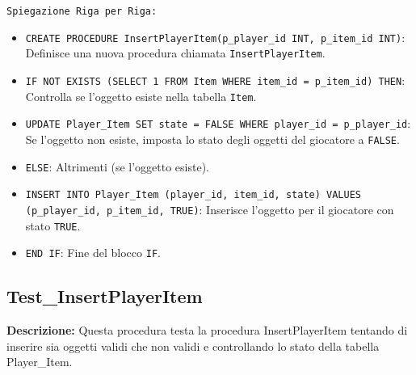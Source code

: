 \documentclass{article}
\begin{document}
\texttt{Spiegazione Riga per Riga:}
\begin{itemize}
    \item \lstinline|CREATE PROCEDURE InsertPlayerItem(p_player_id INT, p_item_id INT)|: Definisce una nuova procedura chiamata \lstinline|InsertPlayerItem|.
    \item \lstinline|IF NOT EXISTS (SELECT 1 FROM Item WHERE item_id = p_item_id) THEN|: Controlla se l'oggetto esiste nella tabella \lstinline|Item|.
    \item \lstinline|UPDATE Player_Item SET state = FALSE WHERE player_id = p_player_id|: Se l'oggetto non esiste, imposta lo stato degli oggetti del giocatore a \lstinline|FALSE|.
    \item \lstinline|ELSE|: Altrimenti (se l'oggetto esiste).
    \item \lstinline|INSERT INTO Player_Item (player_id, item_id, state) VALUES (p_player_id, p_item_id, TRUE)|: Inserisce l'oggetto per il giocatore con stato \lstinline|TRUE|.
    \item \lstinline|END IF|: Fine del blocco \lstinline|IF|.
\end{itemize}

\subsection*{Test\_InsertPlayerItem}

\textbf{Descrizione:} Questa procedura testa la procedura InsertPlayerItem tentando di inserire sia oggetti validi che non validi e controllando lo stato della tabella Player\_Item.
\end{document}
